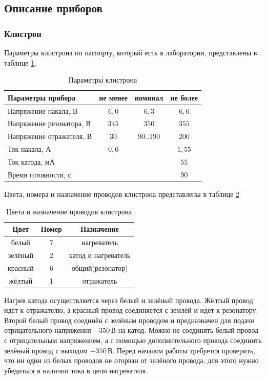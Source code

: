 \documentclass[a4paper,14pt]{extarticle}
\begin{document}
	\subsection{Описание приборов}
	\subsubsection{Клистрон}
	
	Параметры клистрона по паспорту, который есть в лаборатории, представлены в таблице \ref{tab1}.
	
	\begin{table}[h]
		\center
        \caption{Параметры клистрона}
        \label{tab1}
		\begin{tabular}{|p{7cm}|c|c|c|}
			\hline
			\centering Параметры прибора
			& не менее
			& номинал
			& не более \\ \hline
			\centering Напряжение накала, В
			& $6{,}0$
			& $6{,}3$
			& $6{,}6$ \\ \hline
			\centering Напряжение резонатора, В
			& $345$
			& $350$
			& $355$ \\ \hline
			\centering Напряжение отражателя, В
			& $30$
			& $90..190$
			& $200$ \\ \hline
			\centering Ток накала, А
			& $0{,}6$
			& 
			& $1{,}55$ \\ \hline
			\centering Ток катода, мА
			& 
			&
			& $55$ \\ \hline
			\centering Время готовности, с
			&
			&
			& $90$ \\ \hline
		\end{tabular}
	\end{table}
	
	Цвета, номера и назначение проводов клистрона представлены в таблице \ref{tab2}
	\begin{table}[h]
		\center
        \caption{Цвета и назначение проводов клистрона}
        \label{tab2}
		\begin{tabular}{|c|c|c|}
			\hline
			Цвет 	& Номер	& Назначение \\ \hline
			белый 	& 	7	& нагреватель\\ \hline
			зелёный & 	2	& катод и нагреватель\\ \hline
			красный & 	6	& общий(резонатор)\\ \hline
			жёлтый  & 	1	& отражатель\\ \hline
		\end{tabular}
	\end{table}
	
	Нагрев катода осуществляется через белый и зелёный провода. Жёлтый провод идёт к отражателю, а красный провод соединяется с землёй и идёт к резонатору. Второй белый провод соединён с зелёным проводом и предназначен для подачи отрицательного напряжения $-350\,$В на катод. Можно не соединять белый провод с отрицательным напряжением, а с помощью дополнительного провода соединить зелёный провод с выходом $-350\,$В. Перед началом работы требуется проверить, что ни один из белых проводов не оторван от зелёного провода, для этого нужно убедиться в наличии тока в цепи нагревателя. 
	
\end{document}
